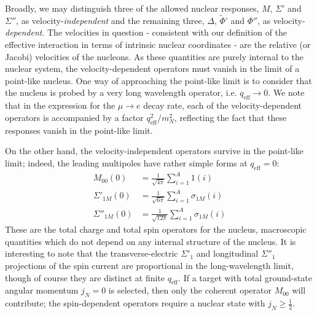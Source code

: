 \documentclass{book}[letterpaper,12pt]
\begin{document}
Broadly, we may distinguish three of the allowed nuclear responses, $M$, $\Sigma'$ and $\Sigma''$, as velocity-\textit{independent} and the remaining three, $\Delta$, $\tilde{\Phi}$' and $\Phi''$, as velocity-\textit{dependent}. The velocities in question - consistent with our definition of the effective interaction in terms of intrinsic nuclear coordinates - are the relative (or Jacobi) velocities of the nucleons. As these quantities are purely internal to the nuclear system, the velocity-dependent operators must vanish in the limit of a point-like nucleus. One way of approaching the point-like limit is to consider that the nucleus is probed by a very long wavelength operator, i.e. $q_\mathrm{eff}\rightarrow 0$. We note that in the expression for the $\mu\rightarrow e$ decay rate, each of the velocity-dependent operators is accompanied by a factor $q_\mathrm{eff}^2/m_N^2$, reflecting the fact that these responses vanish in the point-like limit. 

On the other hand, the velocity-independent operators survive in the point-like limit; indeed, the leading multipoles have rather simple forms at $q_\mathrm{eff}=0$:
\begin{equation}
\begin{split}
M_{00}(0)&=\frac{1}{\sqrt{4\pi}}\sum_{i=1}^A 1(i)\\
\Sigma'_{1M}(0)&=\frac{1}{\sqrt{6\pi}}\sum_{i=1}^A\sigma_{1M}(i)\\
\Sigma''_{1M}(0)&=\frac{1}{\sqrt{12\pi}}\sum_{i=1}^A\sigma_{1M}(i)
\end{split}
\end{equation}
These are the total charge and total spin operators for the nucleus, macroscopic quantities which do not depend on any internal structure of the nucleus. It is interesting to note that the transverse-electric $\Sigma'_1$ and longitudinal $\Sigma''_1$ projections of the spin current are proportional in the long-wavelength limit, though of course they are distinct at finite $q_\mathrm{eff}$. If a target with total ground-state angular momentum $j_N=0$ is selected, then only the coherent operator $M_{00}$ will contribute; the spin-dependent operators require a nuclear state with $j_N\geq \frac{1}{2}$. 
\end{document}
